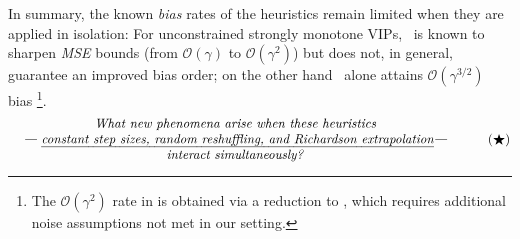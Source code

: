 In summary, the known \emph{bias} rates of the heuristics remain limited when they are applied in isolation:
For unconstrained strongly monotone VIPs, \RRresh\ is known to sharpen \emph{MSE} bounds (from $\mathcal{O}(\gamma)$ to $\mathcal{O}(\gamma^2)$) but does not, in general, guarantee an improved bias order; on the other hand \RRrom\ alone attains $\mathcal{O}(\gamma^{3/2})$ bias \citep{vlatakis2024stochastic}\footnote{The $\mathcal{O}(\gamma^2)$ rate in \citet[Sec.~5, Thm.~6]{vlatakis2024stochastic} is obtained via a reduction to \citet[Sec.~3, Thm.~4]{dieuleveut2020bridging}, which requires additional noise assumptions not met in our setting.}.
\begin{equation}
\parbox{35em}{\centering
\textit{What new phenomena arise when these heuristics\\—
\emph{constant step sizes, random reshuffling, and Richardson extrapolation}—\\
interact simultaneously?}
}
\tag{$\bigstar$}
\label{central-question}
\end{equation}
